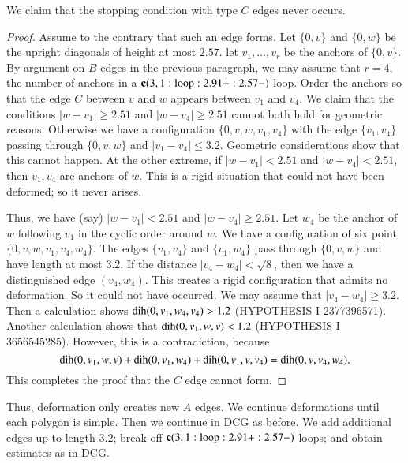 \begin{lemma}
We claim that the stopping condition with type $C$ edges never
occurs.
\end{lemma}

\begin{proof}
Assume to the contrary that such an edge forms.
Let $\{0,v\}$ and $\{0,w\}$ be the upright diagonals of height at most
$2.57$.  let $v_1,\ldots,v_r$ be the anchors of $\{0,v\}$.  By argument on $B$-edges in the previous
paragraph, we may assume that $r=4$, the number of anchors in a ${\operatorname{\bf c}}{(3,1:{\operatorname{loop}}:2.91+:2.57-)}$ loop.  Order the anchors so
that the edge $C$ between $v$ and $w$ appears
between $v_1$ and $v_4$.  We claim that the
conditions $|w-v_1|\ge 2.51$ and $|w-v_4|\ge 2.51$ cannot
both hold for geometric reasons.
Otherwise we have a configuration $\{0,v,w,v_1,v_4\}$ with the edge $\{v_1,v_4\}$ passing through $\{0,v,w\}$ and $|v_1-v_4|\le 3.2$.  Geometric considerations show that this cannot happen.  At the other extreme, if $|w-v_1|<2.51$ and $|w-v_4|<2.51$, then $v_1,v_4$ are anchors of $w$.  This is a rigid situation that could not have been deformed; so it never arises.  

Thus, we have (say) $|w-v_1|<2.51$ and $|w-v_4|\ge 2.51$.  Let $w_4$ be the anchor of $w$ following $v_1$ in the cyclic order around $w$.
We have a configuration of six point $\{0,v,w,v_1,v_4,w_4\}$.  The edges $\{v_1,v_4\}$ and $\{v_1,w_4\}$ pass through $\{0,v,w\}$ and have length at most $3.2$.  If the distance $|v_4-w_4|<\sqrt8$, then we have a distinguished edge $(v_4,w_4)$.  This creates a rigid configuration that admits no deformation.  So it could not have occurred.  We may assume that $|v_4-w_4|\ge 3.2$.  Then a calculation shows ${\operatorname{dih}}(0,v_1,w_4,v_4) > 1.2$ (HYPOTHESIS I 2377396571).    Another calculation shows that
${\operatorname{dih}}(0,v_1,w,v) < 1.2$ (HYPOTHESIS I 3656545285).  However, this is a contradiction, because
  $$
  {\operatorname{dih}}(0,v_1,w,v)+{\operatorname{dih}}(0,v_1,w_4) + {\operatorname{dih}}(0,v_1,v,v_4) = {\operatorname{dih}}(0,v,v_4,w_4).
  $$
This completes the proof that the $C$ edge cannot form.
\end{proof}



Thus, deformation only creates new $A$ edges.  We continue deformations until each polygon is simple.  Then we continue in DCG as before.  We add additional edges up to length $3.2$; break off ${\operatorname{\bf c}}{(3,1:{\operatorname{loop}}:2.91+:2.57-)}$ loops; and obtain estimates as in DCG.







